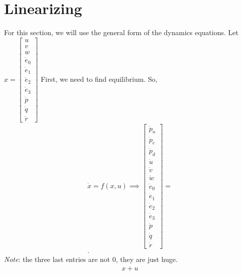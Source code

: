 \documentclass[11pt]{article}
\newcommand{\mathse}[1]{\begin{gather*}#1\end{gather*}}
\newcommand{\mat}[1]{\begin{bmatrix} #1 \end{bmatrix}}
\newcommand{\sinput}[1]{}
\begin{document}
\section{Linearizing}
For this section, we will use the general form of the dynamics equations. Let $x = \mat{u\\ v\\ w\\ \dot{e}_0\\ \dot{e}_1\\ \dot{e}_2\\ \dot{e}_3\\ \dot{p}\\ \dot{q}\\ \dot{r}} $ First, we need to find equilibrium. So,
\mathse{
    \dot{x} = f(x, u) \implies \mat{\dot{p}_n\\ \dot{p}_e\\ \dot{p}_d\\ \dot{u}\\ \dot{v}\\ \dot{w}\\ \dot{e}_0\\ \dot{e}_1\\ \dot{e}_2\\ \dot{e}_3\\ \dot{p}\\ \dot{q}\\ \dot{r}} =\\ \sinput{2_f}.
}
\emph{Note}: the three last entries are not 0, they are just huge.
{\tiny
\mathse{
    \sinput{2_A}x + \sinput{2_B}u
}
}
\end{document}
